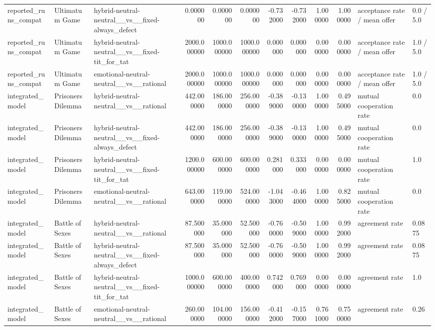 \begin{tabular}{lllrrrrrrrll}
reported\_runs\_compat & Ultimatum Game & hybrid-neutral-neutral\_\_vs\_\_fixed-always\_defect & 0.000000 & 0.000000 & 0.000000 & -0.732000 & -0.732000 & 1.000000 & 1.000000 & acceptance rate / mean offer & 0.0 / 5.0 \\
reported\_runs\_compat & Ultimatum Game & hybrid-neutral-neutral\_\_vs\_\_fixed-tit\_for\_tat & 2000.000000 & 1000.000000 & 1000.000000 & 0.000000 & 0.000000 & 0.000000 & 0.000000 & acceptance rate / mean offer & 1.0 / 5.0 \\
reported\_runs\_compat & Ultimatum Game & emotional-neutral-neutral\_\_vs\_\_rational & 2000.000000 & 1000.000000 & 1000.000000 & 0.000000 & 0.000000 & 0.000000 & 0.000000 & acceptance rate / mean offer & 1.0 / 5.0 \\
integrated\_model & Prisoners Dilemma & hybrid-neutral-neutral\_\_vs\_\_rational & 442.000000 & 186.000000 & 256.000000 & -0.389000 & -0.130000 & 1.000000 & 0.495000 & mutual cooperation rate & 0.0 \\
integrated\_model & Prisoners Dilemma & hybrid-neutral-neutral\_\_vs\_\_fixed-always\_defect & 442.000000 & 186.000000 & 256.000000 & -0.389000 & -0.130000 & 1.000000 & 0.495000 & mutual cooperation rate & 0.0 \\
integrated\_model & Prisoners Dilemma & hybrid-neutral-neutral\_\_vs\_\_fixed-tit\_for\_tat & 1200.000000 & 600.000000 & 600.000000 & 0.281000 & 0.333000 & 0.000000 & 0.000000 & mutual cooperation rate & 1.0 \\
integrated\_model & Prisoners Dilemma & emotional-neutral-neutral\_\_vs\_\_rational & 643.000000 & 119.000000 & 524.000000 & -1.043000 & -0.464000 & 1.000000 & 0.825000 & mutual cooperation rate & 0.0 \\
integrated\_model & Battle of Sexes & hybrid-neutral-neutral\_\_vs\_\_rational & 87.500000 & 35.000000 & 52.500000 & -0.760000 & -0.509000 & 1.000000 & 0.992000 & agreement rate & 0.0875 \\
integrated\_model & Battle of Sexes & hybrid-neutral-neutral\_\_vs\_\_fixed-always\_defect & 87.500000 & 35.000000 & 52.500000 & -0.760000 & -0.509000 & 1.000000 & 0.992000 & agreement rate & 0.0875 \\
integrated\_model & Battle of Sexes & hybrid-neutral-neutral\_\_vs\_\_fixed-tit\_for\_tat & 1000.000000 & 600.000000 & 400.000000 & 0.742000 & 0.769000 & 0.000000 & 0.000000 & agreement rate & 1.0 \\
integrated\_model & Battle of Sexes & emotional-neutral-neutral\_\_vs\_\_rational & 260.000000 & 104.000000 & 156.000000 & -0.412000 & -0.157000 & 0.761000 & 0.750000 & agreement rate & 0.26 \\

\end{tabular}
